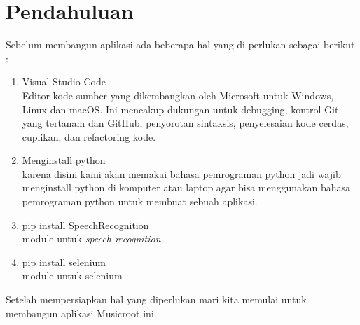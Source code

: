 \section{Pendahuluan}

Sebelum membangun aplikasi ada beberapa hal yang di perlukan sebagai berikut :
\begin{enumerate}
    \item Visual Studio Code\\ 
    Editor kode sumber yang dikembangkan oleh Microsoft untuk Windows, Linux dan macOS. Ini mencakup dukungan untuk debugging, kontrol Git yang tertanam dan GitHub, penyorotan sintaksis, penyelesaian kode cerdas, cuplikan, dan refactoring kode.
    
    \item Menginstall python \\
    karena disini kami akan memakai bahasa pemrograman python jadi wajib menginstall python di komputer atau laptop agar bisa menggunakan bahasa pemrograman python untuk membuat sebuah aplikasi.
    \item pip install SpeechRecognition\\
    module untuk \textit{speech recognition} 
    \item pip install selenium \\
    module untuk selenium 
\end{enumerate}
Setelah mempersiapkan hal yang diperlukan mari kita memulai untuk membangun aplikasi Musicroot ini.


